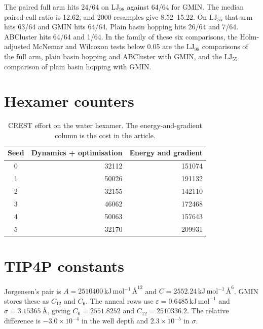 \documentclass[aip,jcp,preprint,amsmath,amssymb]{revtex4-2}
\begin{document}
The paired full arm hits 24/64 on \(\mathrm{LJ}_{98}\) against 64/64 for GMIN.
The median paired call ratio is 12.62, and 2000 resamples give 8.52--15.22.
On \(\mathrm{LJ}_{55}\) that arm hits 63/64 and GMIN hits 64/64.
Plain basin hopping hits 26/64 and 7/64.
ABCluster hits 64/64 and 1/64.
In the family of these six comparisons, the Holm-adjusted McNemar and Wilcoxon tests below 0.05 are the \(\mathrm{LJ}_{98}\) comparisons of the full arm, plain basin hopping and ABCluster with GMIN, and the \(\mathrm{LJ}_{55}\) comparison of plain basin hopping with GMIN.

\section{Hexamer counters}
\begin{table}
\caption{CREST effort on the water hexamer.
The energy-and-gradient column is the cost in the article.}
\begin{ruledtabular}
\begin{tabular}{crr}
Seed & Dynamics + optimisation & Energy and gradient \\
\hline
0 & 32112 & 151074 \\
1 & 50026 & 191132 \\
2 & 32155 & 142110 \\
3 & 46062 & 172468 \\
4 & 50063 & 157643 \\
5 & 32170 & 209931 \\
\end{tabular}
\end{ruledtabular}
\end{table}

\section{TIP4P constants}
Jorgensen's pair is \(A=2510400\,\mathrm{kJ\,mol^{-1}\,\text{\AA}^{12}}\) and \(C=2552.24\,\mathrm{kJ\,mol^{-1}\,\text{\AA}^{6}}\).\cite{jorgensen1983}
GMIN stores these as \(C_{12}\) and \(C_6\).
The anneal rows use \(\varepsilon=0.6485\,\mathrm{kJ\,mol^{-1}}\) and \(\sigma=3.15365\,\text{\AA}\), giving \(C_6=2551.8252\) and \(C_{12}=2510336.2\).
The relative difference is \(-3.0\times 10^{-4}\) in the well depth and \(2.3\times 10^{-5}\) in \(\sigma\).
\end{document}
